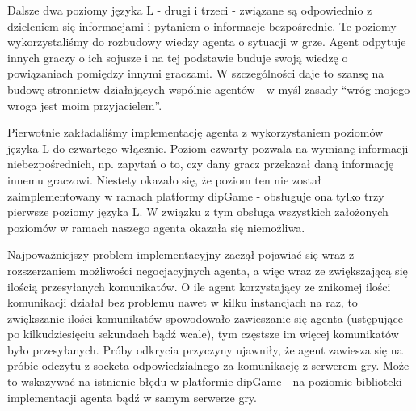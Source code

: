 			    Dalsze dwa poziomy języka L - drugi i trzeci - związane są odpowiednio z dzieleniem się informacjami i pytaniem o informacje bezpośrednie. Te poziomy wykorzystaliśmy do rozbudowy wiedzy agenta o sytuacji w grze. Agent odpytuje innych graczy o ich sojusze i na tej podstawie buduje swoją wiedzę o powiązaniach pomiędzy innymi graczami. W szczególności daje to szansę na budowę stronnictw działających wspólnie agentów - w myśl zasady “wróg mojego wroga jest moim przyjacielem”.

				    Pierwotnie zakładaliśmy implementację agenta z wykorzystaniem poziomów języka L do czwartego włącznie. Poziom czwarty pozwala na wymianę informacji niebezpośrednich, np. zapytań o to, czy dany gracz przekazał daną informację innemu graczowi. Niestety okazało się, że poziom ten nie został zaimplementowany w ramach platformy dipGame - obsługuje ona tylko trzy pierwsze poziomy języka L. W związku z tym obsługa wszystkich założonych poziomów w ramach naszego agenta okazała się niemożliwa.

					Najpoważniejszy problem implementacyjny zaczął pojawiać się wraz z rozszerzaniem możliwości negocjacyjnych agenta, a więc wraz ze zwiększającą się ilością przesyłanych komunikatów. O ile agent korzystający ze znikomej ilości komunikacji działał bez problemu nawet w kilku instancjach na raz, to zwiększanie ilości komunikatów spowodowało zawieszanie się agenta (ustępujące po kilkudziesięciu sekundach bądź wcale), tym częstsze im więcej komunikatów było przesyłanych. Próby odkrycia przyczyny ujawniły, że agent zawiesza się na próbie odczytu z socketa odpowiedzialnego za komunikację z serwerem gry. Może to wskazywać na istnienie błędu w platformie dipGame - na poziomie biblioteki implementacji agenta bądź w samym serwerze gry.
